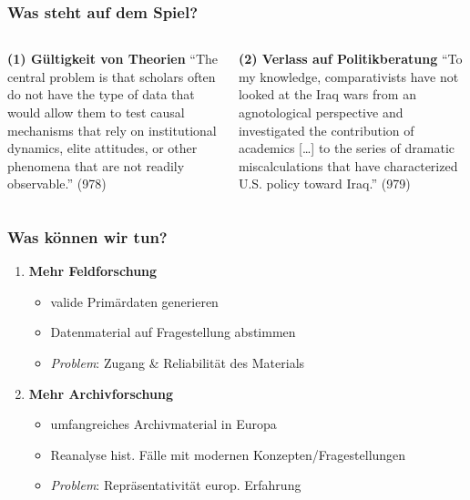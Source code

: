 \documentclass{beamer}
\begin{document}
\begin{frame}
  \frametitle{Was steht auf dem Spiel?}
  \begin{columns}[t]
    \begin{column}{.5\textwidth}
      \textbf{(1) Gültigkeit von Theorien}
      \small
      ``The central problem is that scholars often do not have
      the type of data that would allow them to test causal
      mechanisms that rely on institutional dynamics, elite
      attitudes, or other phenomena that are not readily
      observable.'' (978)
    \end{column}
    \begin{column}{.5\textwidth}
      \textbf{(2) Verlass auf Politikberatung}
      \small
      ``To my knowledge, comparativists have not looked at the
      Iraq wars from an agnotological perspective and
      investigated the contribution of academics [\dots]
      to the series of dramatic miscalculations that have
      characterized U.S. policy toward Iraq.'' (979)
    \end{column}
  \end{columns}
\end{frame}

\begin{frame}
  \frametitle{Was können wir tun?}
  \begin{enumerate}
    \item \textbf{Mehr Feldforschung}
    \begin{itemize}
      \item valide Primärdaten generieren
      \item Datenmaterial auf Fragestellung abstimmen
      \item \textit{Problem}: Zugang \& Reliabilität des Materials
    \end{itemize}
    \item \textbf{Mehr Archivforschung}
    \begin{itemize}
      \item umfangreiches Archivmaterial in Europa
      \item Reanalyse hist. Fälle mit modernen Konzepten/Fragestellungen
      \item \textit{Problem}: Repräsentativität europ. Erfahrung
    \end{itemize}
  \end{enumerate}
\end{frame}
\end{document}
